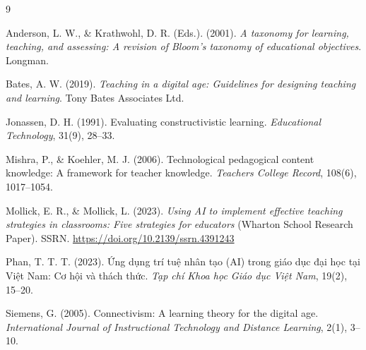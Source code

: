 \renewcommand{\refname}{7. Tài liệu tham khảo}

\begin{thebibliography}{9}

Anderson, L. W., \& Krathwohl, D. R. (Eds.). (2001). \textit{A taxonomy for learning, teaching, and assessing: A revision of Bloom's taxonomy of educational objectives}. Longman.

Bates, A. W. (2019). \textit{Teaching in a digital age: Guidelines for designing teaching and learning}. Tony Bates Associates Ltd.

Jonassen, D. H. (1991). Evaluating constructivistic learning. \textit{Educational Technology}, 31(9), 28--33.

Mishra, P., \& Koehler, M. J. (2006). Technological pedagogical content knowledge: A framework for teacher knowledge. \textit{Teachers College Record}, 108(6), 1017--1054.

Mollick, E. R., \& Mollick, L. (2023). \textit{Using AI to implement effective teaching strategies in classrooms: Five strategies for educators} (Wharton School Research Paper). SSRN. \url{https://doi.org/10.2139/ssrn.4391243}

Phan, T. T. T. (2023). Ứng dụng trí tuệ nhân tạo (AI) trong giáo dục đại học tại Việt Nam: Cơ hội và thách thức. \textit{Tạp chí Khoa học Giáo dục Việt Nam}, 19(2), 15--20.

Siemens, G. (2005). Connectivism: A learning theory for the digital age. \textit{International Journal of Instructional Technology and Distance Learning}, 2(1), 3--10.

\end{thebibliography}
